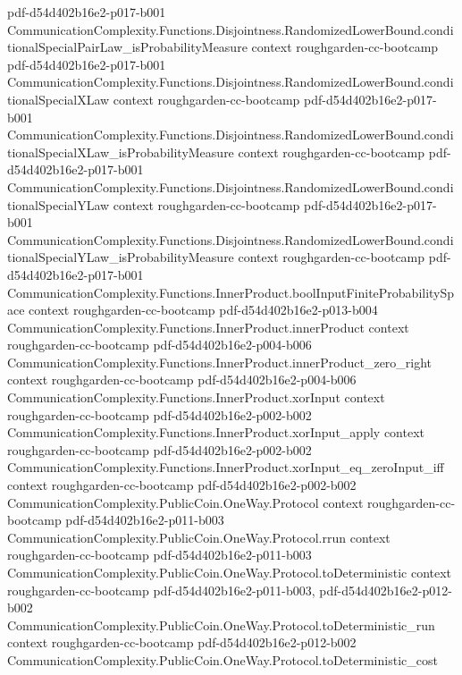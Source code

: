 \begin{theorem}
  {pdf-d54d402b16e2-p017-b001}
\proofstep
  {CommunicationComplexity.Functions.Disjointness.RandomizedLowerBound.conditionalSpecialPairLaw_isProbabilityMeasure}
  {context}
  {roughgarden-cc-bootcamp}
  {pdf-d54d402b16e2-p017-b001}
\proofstep
  {CommunicationComplexity.Functions.Disjointness.RandomizedLowerBound.conditionalSpecialXLaw}
  {context}
  {roughgarden-cc-bootcamp}
  {pdf-d54d402b16e2-p017-b001}
\proofstep
  {CommunicationComplexity.Functions.Disjointness.RandomizedLowerBound.conditionalSpecialXLaw_isProbabilityMeasure}
  {context}
  {roughgarden-cc-bootcamp}
  {pdf-d54d402b16e2-p017-b001}
\proofstep
  {CommunicationComplexity.Functions.Disjointness.RandomizedLowerBound.conditionalSpecialYLaw}
  {context}
  {roughgarden-cc-bootcamp}
  {pdf-d54d402b16e2-p017-b001}
\proofstep
  {CommunicationComplexity.Functions.Disjointness.RandomizedLowerBound.conditionalSpecialYLaw_isProbabilityMeasure}
  {context}
  {roughgarden-cc-bootcamp}
  {pdf-d54d402b16e2-p017-b001}
\proofstep
  {CommunicationComplexity.Functions.InnerProduct.boolInputFiniteProbabilitySpace}
  {context}
  {roughgarden-cc-bootcamp}
  {pdf-d54d402b16e2-p013-b004}
\proofstep
  {CommunicationComplexity.Functions.InnerProduct.innerProduct}
  {context}
  {roughgarden-cc-bootcamp}
  {pdf-d54d402b16e2-p004-b006}
\proofstep
  {CommunicationComplexity.Functions.InnerProduct.innerProduct_zero_right}
  {context}
  {roughgarden-cc-bootcamp}
  {pdf-d54d402b16e2-p004-b006}
\proofstep
  {CommunicationComplexity.Functions.InnerProduct.xorInput}
  {context}
  {roughgarden-cc-bootcamp}
  {pdf-d54d402b16e2-p002-b002}
\proofstep
  {CommunicationComplexity.Functions.InnerProduct.xorInput_apply}
  {context}
  {roughgarden-cc-bootcamp}
  {pdf-d54d402b16e2-p002-b002}
\proofstep
  {CommunicationComplexity.Functions.InnerProduct.xorInput_eq_zeroInput_iff}
  {context}
  {roughgarden-cc-bootcamp}
  {pdf-d54d402b16e2-p002-b002}
\proofstep
  {CommunicationComplexity.PublicCoin.OneWay.Protocol}
  {context}
  {roughgarden-cc-bootcamp}
  {pdf-d54d402b16e2-p011-b003}
\proofstep
  {CommunicationComplexity.PublicCoin.OneWay.Protocol.rrun}
  {context}
  {roughgarden-cc-bootcamp}
  {pdf-d54d402b16e2-p011-b003}
\proofstep
  {CommunicationComplexity.PublicCoin.OneWay.Protocol.toDeterministic}
  {context}
  {roughgarden-cc-bootcamp}
  {pdf-d54d402b16e2-p011-b003,
    pdf-d54d402b16e2-p012-b002}
\proofstep
  {CommunicationComplexity.PublicCoin.OneWay.Protocol.toDeterministic_run}
  {context}
  {roughgarden-cc-bootcamp}
  {pdf-d54d402b16e2-p012-b002}
\proofstep
  {CommunicationComplexity.PublicCoin.OneWay.Protocol.toDeterministic_cost}

\end{theorem}
